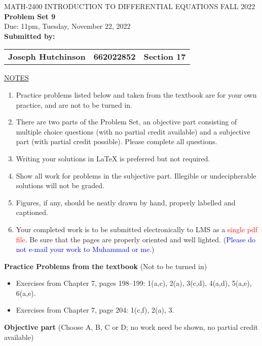 \documentclass{article}
\begin{document}
\begin{center}
\large{ MATH-2400 \hspace{.27in}  INTRODUCTION TO DIFFERENTIAL EQUATIONS \hspace{.27in}FALL 2022\bigskip\\ {\bf Problem Set 9} \smallskip\\ Due: 11pm, Tuesday, November 22, 2022}\\
\textbf{Submitted by:}\\
\begin{tabular}{ c c c }
\textbf{Joseph Hutchinson} & \textbf{662022852} & \textbf{Section 17}\\
\end{tabular}

\end{center}
\noindent
\underline{NOTES}
\begin{enumerate}
\item Practice problems listed below and taken from the textbook are for your own practice, and are not to be turned in.
\item There are two parts of the Problem Set, an objective part consisting of multiple choice questions (with no partial credit available) and a subjective part (with partial credit possible).  Please complete all questions.
\item Writing your solutions in {\LaTeX} is preferred but not required.
\item Show all work for problems in the subjective part.  Illegible or undecipherable solutions will not be graded. 
\item Figures, if any, should be neatly drawn by hand, properly labelled and captioned.  
\item Your completed work is to be submitted electronically to LMS  as a \textcolor{red}{single pdf file}. Be sure that the pages are properly oriented and well lighted.  (\textcolor{blue}{Please do not e-mail your work to Muhammad or me.})
\end{enumerate}

\bigskip\noindent
{\bf Practice Problems from the textbook} (Not to be turned in)
\begin{itemize}
\item
Exercises from Chapter 7, pages 198--199: 1(a,c), 2(a), 3(c,d), 4(a,d), 5(a,e), 6(a,e).
\item
Exercises from Chapter 7, page 204: 1(c,f), 2(a), 3.
\end{itemize}

\bigskip\noindent
{\bf Objective part} (Choose A, B, C or D; no work need be shown, no partial credit available)
\end{document}
